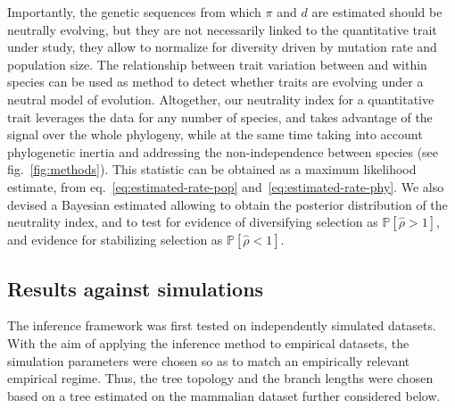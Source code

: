 \documentclass{article}
\newcommand{\proba}{\mathbb{P}}
\newcommand{\EstNI}{\widehat{\rho}}
\begin{document}
Importantly, the genetic sequences from which $\pi$ and $d$ are estimated should be neutrally evolving, but they are not necessarily linked to the quantitative trait under study, they allow to normalize for diversity driven by mutation rate and population size.
The relationship between trait variation between and within species can be used as method to detect whether traits are evolving under a neutral model of evolution.
Altogether, our neutrality index for a quantitative trait leverages the data for any number of species, and takes advantage of the signal over the whole phylogeny, while at the same time taking into account phylogenetic inertia and addressing the non-independence between species (see fig.~\ref{fig:methods}).
This statistic can be obtained as a maximum likelihood estimate, from eq.~\ref{eq:estimated-rate-pop} and~\ref{eq:estimated-rate-phy}.
We also devised a Bayesian estimated allowing to obtain the posterior distribution of the neutrality index, and to test for evidence of diversifying selection as $\proba [\EstNI > 1]$, and evidence for stabilizing selection as $\proba [\EstNI < 1]$.

\subsection*{Results against simulations}\label{subsec:results-against-simulations}

The inference framework was first tested on independently simulated datasets.
With the aim of applying the inference method to empirical datasets, the simulation parameters were chosen so as to match an empirically relevant empirical regime.
Thus, the tree topology and the branch lengths were chosen based on a tree estimated on the mammalian dataset further considered below.
\end{document}
